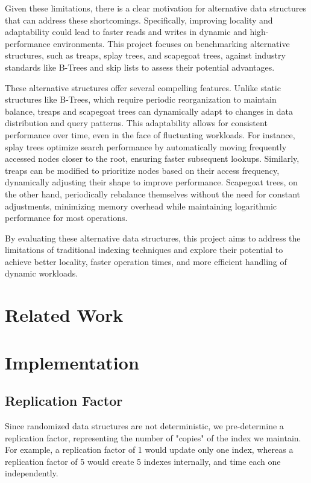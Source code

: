 \documentclass[sigconf]{acmart}
\begin{document}
Given these limitations, there is a clear motivation for alternative data structures that can address these shortcomings. Specifically, improving locality and adaptability could lead to faster reads and writes in dynamic and high-performance environments. This project focuses on benchmarking alternative structures, such as treaps, splay trees, and scapegoat trees, against industry standards like B-Trees and skip lists to assess their potential advantages.

These alternative structures offer several compelling features. Unlike static structures like B-Trees, which require periodic reorganization to maintain balance, treaps and scapegoat trees can dynamically adapt to changes in data distribution and query patterns. This adaptability allows for consistent performance over time, even in the face of fluctuating workloads. For instance, splay trees optimize search performance by automatically moving frequently accessed nodes closer to the root, ensuring faster subsequent lookups. Similarly, treaps can be modified to prioritize nodes based on their access frequency, dynamically adjusting their shape to improve performance. Scapegoat trees, on the other hand, periodically rebalance themselves without the need for constant adjustments, minimizing memory overhead while maintaining logarithmic performance for most operations.

By evaluating these alternative data structures, this project aims to address the limitations of traditional indexing techniques and explore their potential to achieve better locality, faster operation times, and more efficient handling of dynamic workloads.


\section{Related Work}


\section{Implementation}

\subsection{Replication Factor}
Since randomized data structures are not deterministic, we pre-determine a replication factor, representing the number of "copies" of the index we maintain. For example, a replication factor of 1 would update only one index, whereas a replication factor of 5 would create 5 indexes internally, and time each one independently.
\end{document}
